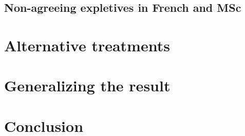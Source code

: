 \documentclass[11pt, letterpaper]{paper_nick}
\begin{document}
\subsection{Non-agreeing expletives in French and MSc}



\section{Alternative treatments}
\section{Generalizing the result}
\section{Conclusion}



\setlength{\bibsep}{0pt}

\end{document}
